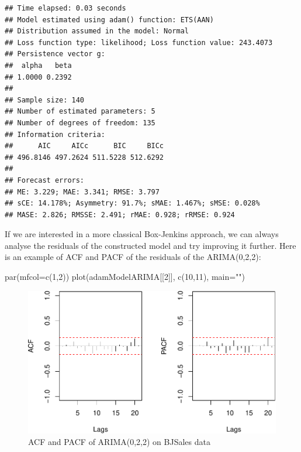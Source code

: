 \documentclass[
]{book}
\newenvironment{Shaded}{\begin{snugshade}}{\end{snugshade}}
\newcommand{\AttributeTok}[1]{\textcolor[rgb]{0.77,0.63,0.00}{#1}}
\newcommand{\DecValTok}[1]{\textcolor[rgb]{0.00,0.00,0.81}{#1}}
\newcommand{\FunctionTok}[1]{\textcolor[rgb]{0.00,0.00,0.00}{#1}}
\newcommand{\NormalTok}[1]{#1}
\newcommand{\StringTok}[1]{\textcolor[rgb]{0.31,0.60,0.02}{#1}}
\theoremstyle{definition}
\theoremstyle{definition}
\theoremstyle{definition}
\theoremstyle{definition}
\theoremstyle{remark}
\begin{document}
\begin{verbatim}
## Time elapsed: 0.03 seconds
## Model estimated using adam() function: ETS(AAN)
## Distribution assumed in the model: Normal
## Loss function type: likelihood; Loss function value: 243.4073
## Persistence vector g:
##  alpha   beta 
## 1.0000 0.2392 
## 
## Sample size: 140
## Number of estimated parameters: 5
## Number of degrees of freedom: 135
## Information criteria:
##      AIC     AICc      BIC     BICc 
## 496.8146 497.2624 511.5228 512.6292 
## 
## Forecast errors:
## ME: 3.229; MAE: 3.341; RMSE: 3.797
## sCE: 14.178%; Asymmetry: 91.7%; sMAE: 1.467%; sMSE: 0.028%
## MASE: 2.826; RMSSE: 2.491; rMAE: 0.928; rRMSE: 0.924
\end{verbatim}

If we are interested in a more classical Box-Jenkins approach, we can always analyse the residuals of the constructed model and try improving it further. Here is an example of ACF and PACF of the residuals of the ARIMA(0,2,2):

\begin{Shaded}
\begin{Highlighting}[]
\FunctionTok{par}\NormalTok{(}\AttributeTok{mfcol=}\FunctionTok{c}\NormalTok{(}\DecValTok{1}\NormalTok{,}\DecValTok{2}\NormalTok{))}
\FunctionTok{plot}\NormalTok{(adamModelARIMA[[}\DecValTok{2}\NormalTok{]], }\FunctionTok{c}\NormalTok{(}\DecValTok{10}\NormalTok{,}\DecValTok{11}\NormalTok{), }\AttributeTok{main=}\StringTok{""}\NormalTok{)}
\end{Highlighting}
\end{Shaded}

\begin{figure}
\centering
\includegraphics{Svetunkov--2022----ADAM_files/figure-latex/adamARIMAPlotBJSalesACFPACF-1.pdf}
\caption{\label{fig:adamARIMAPlotBJSalesACFPACF}ACF and PACF of ARIMA(0,2,2) on BJSales data}
\end{figure}
\end{document}
